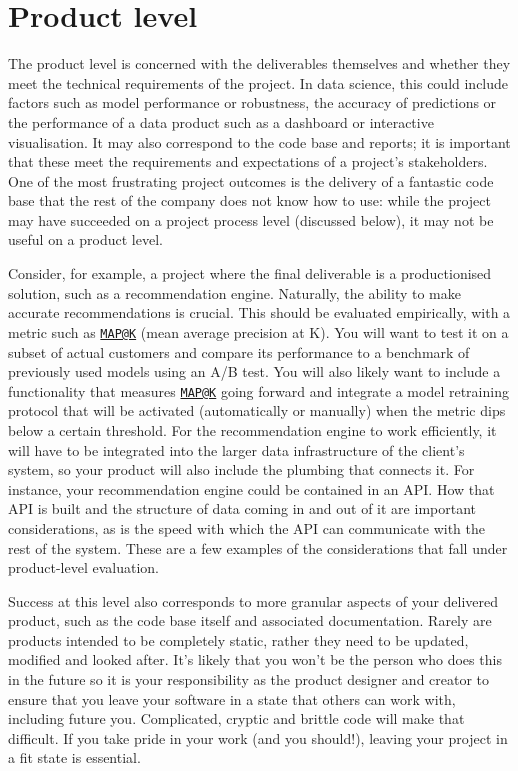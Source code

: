 \documentclass[
]{book}
\begin{document}
\hypertarget{product-level}{%
\section{Product level}\label{product-level}}

The product level is concerned with the deliverables themselves and whether they meet the technical requirements of the project. In data science, this could include factors such as model performance or robustness, the accuracy of predictions or the performance of a data product such as a dashboard or interactive visualisation. It may also correspond to the code base and reports; it is important that these meet the requirements and expectations of a project's stakeholders. One of the most frustrating project outcomes is the delivery of a fantastic code base that the rest of the company does not know how to use: while the project may have succeeded on a project process level (discussed below), it may not be useful on a product level.

Consider, for example, a project where the final deliverable is a productionised solution, such as a recommendation engine. Naturally, the ability to make accurate recommendations is crucial. This should be evaluated empirically, with a metric such as \href{mailto:MAP@K}{\nolinkurl{MAP@K}} (mean average precision at K). You will want to test it on a subset of actual customers and compare its performance to a benchmark of previously used models using an A/B test. You will also likely want to include a functionality that measures \href{mailto:MAP@K}{\nolinkurl{MAP@K}} going forward and integrate a model retraining protocol that will be activated (automatically or manually) when the metric dips below a certain threshold. For the recommendation engine to work efficiently, it will have to be integrated into the larger data infrastructure of the client's system, so your product will also include the plumbing that connects it. For instance, your recommendation engine could be contained in an API. How that API is built and the structure of data coming in and out of it are important considerations, as is the speed with which the API can communicate with the rest of the system. These are a few examples of the considerations that fall under product-level evaluation.

Success at this level also corresponds to more granular aspects of your delivered product, such as the code base itself and associated documentation. Rarely are products intended to be completely static, rather they need to be updated, modified and looked after. It's likely that you won't be the person who does this in the future so it is your responsibility as the product designer and creator to ensure that you leave your software in a state that others can work with, including future you. Complicated, cryptic and brittle code will make that difficult. If you take pride in your work (and you should!), leaving your project in a fit state is essential.
\end{document}
